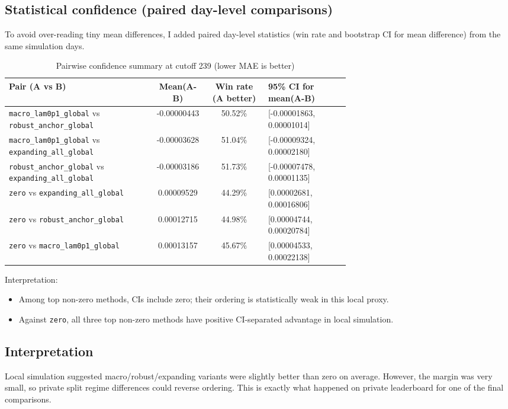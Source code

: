 \subsection{Statistical confidence (paired day-level comparisons)}
To avoid over-reading tiny mean differences, I added paired day-level statistics (win rate and bootstrap CI for mean difference) from the same simulation days.
\begin{table}[h]
\centering
\scriptsize
\caption{Pairwise confidence summary at cutoff 239 (lower MAE is better)}
\begin{tabular}{p{0.43\linewidth} c c p{0.24\linewidth}}
\toprule
Pair (A vs B) & Mean(A-B) & Win rate (A better) & 95\% CI for mean(A-B) \\
\midrule
\texttt{macro\_lam0p1\_global} vs \texttt{robust\_anchor\_global} & -0.00000443 & 50.52\% & [-0.00001863, 0.00001014] \\
\texttt{macro\_lam0p1\_global} vs \texttt{expanding\_all\_global} & -0.00003628 & 51.04\% & [-0.00009324, 0.00002180] \\
\texttt{robust\_anchor\_global} vs \texttt{expanding\_all\_global} & -0.00003186 & 51.73\% & [-0.00007478, 0.00001135] \\
\texttt{zero} vs \texttt{expanding\_all\_global} & 0.00009529 & 44.29\% & [0.00002681, 0.00016806] \\
\texttt{zero} vs \texttt{robust\_anchor\_global} & 0.00012715 & 44.98\% & [0.00004744, 0.00020784] \\
\texttt{zero} vs \texttt{macro\_lam0p1\_global} & 0.00013157 & 45.67\% & [0.00004533, 0.00022138] \\
\bottomrule
\end{tabular}
\end{table}

Interpretation:
\begin{itemize}[leftmargin=1.5em]
  \item Among top non-zero methods, CIs include zero; their ordering is statistically weak in this local proxy.
  \item Against \texttt{zero}, all three top non-zero methods have positive CI-separated advantage in local simulation.
\end{itemize}

\subsection{Interpretation}
Local simulation suggested macro/robust/expanding variants were slightly better than zero on average. However, the margin was very small, so private split regime differences could reverse ordering. This is exactly what happened on private leaderboard for one of the final comparisons.
